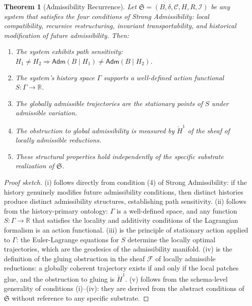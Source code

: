 \documentclass[12pt,openany]{book}
\theoremstyle{plain}
\newtheorem{theorem}{Theorem}[chapter]
\theoremstyle{definition}
\theoremstyle{remark}
\begin{document}
\begin{theorem}[Admissibility Recurrence]
\label{thm:recurrence}
Let $\mathfrak{S} = (B, \delta, \mathcal{C}, H, R, \mathcal{I})$ be any system that satisfies the four conditions of Strong Admissibility: local compatibility, recursive restructuring, invariant transportability, and historical modification of future admissibility. Then:
\begin{enumerate}[label=(\roman*)]
  \item The system exhibits path sensitivity: $H_1 \neq H_2 \Rightarrow \mathsf{Adm}(B \mid H_1) \neq \mathsf{Adm}(B \mid H_2)$.
  \item The system's history space $\Gamma$ supports a well-defined action functional $S : \Gamma \to \mathbb{R}$.
  \item The globally admissible trajectories are the stationary points of $S$ under admissible variation.
  \item The obstruction to global admissibility is measured by $\check{H}^1$ of the sheaf of locally admissible reductions.
  \item These structural properties hold independently of the specific substrate realization of $\mathfrak{S}$.
\end{enumerate}
\end{theorem}

\begin{proof}[Proof sketch]
(i) follows directly from condition (4) of Strong Admissibility: if the history genuinely modifies future admissibility conditions, then distinct histories produce distinct admissibility structures, establishing path sensitivity. (ii) follows from the history-primary ontology: $\Gamma$ is a well-defined space, and any function $S : \Gamma \to \mathbb{R}$ that satisfies the locality and additivity conditions of the Lagrangian formalism is an action functional. (iii) is the principle of stationary action applied to $\Gamma$: the Euler-Lagrange equations for $S$ determine the locally optimal trajectories, which are the geodesics of the admissibility manifold. (iv) is the definition of the gluing obstruction in the sheaf $\mathcal{F}$ of locally admissible reductions: a globally coherent trajectory exists if and only if the local patches glue, and the obstruction to gluing is $\check{H}^1$. (v) follows from the schema-level generality of conditions (i)--(iv): they are derived from the abstract conditions of $\mathfrak{S}$ without reference to any specific substrate.
\end{proof}
\end{document}
